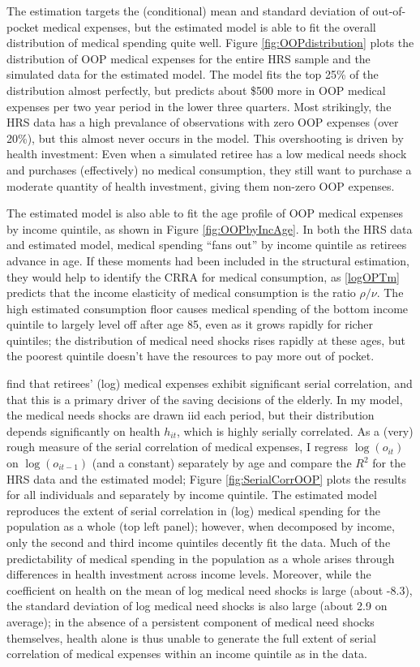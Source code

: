 \documentclass[12pt,pdftex,letterpaper]{article}
\newcommand{\Health}{h}
\newcommand{\OOP}{o}
\newcommand{\CRRAcon}{\rho}
\newcommand{\CRRAcare}{\nu}
\begin{document}
The estimation targets the (conditional) mean and standard deviation of out-of-pocket medical expenses, but the estimated model is able to fit the overall distribution of medical spending quite well.  Figure \ref{fig:OOPdistribution} plots the distribution of OOP medical expenses for the entire HRS sample and the simulated data for the estimated model.  The model fits the top 25\% of the distribution almost perfectly, but predicts about \$500 more in OOP medical expenses per two year period in the lower three quarters.  Most strikingly, the HRS data has a high prevalance of observations with zero OOP expenses (over 20\%), but this almost never occurs in the model.  This overshooting is driven by health investment: Even when a simulated retiree has a low medical needs shock and purchases (effectively) no medical consumption, they still want to purchase a moderate quantity of health investment, giving them non-zero OOP expenses.

The estimated model is also able to fit the age profile of OOP medical expenses by income quintile, as shown in Figure \ref{fig:OOPbyIncAge}.  In both the HRS data and estimated model, medical spending ``fans out'' by income quintile as retirees advance in age.  If these moments had been included in the structural estimation, they would help to identify the CRRA for medical consumption, as \eqref{logOPTm} predicts that the income elasticity of medical consumption is the ratio $\CRRAcon/\CRRAcare$.  The high estimated consumption floor causes medical spending of the bottom income quintile to largely level off after age 85, even as it grows rapidly for richer quintiles; the distribution of medical need shocks rises rapidly at these ages, but the poorest quintile doesn't have the resources to pay more out of pocket.

\cite{dinardi10} find that retirees' (log) medical expenses exhibit significant serial correlation, and that this is a primary driver of the saving decisions of the elderly.  In my model, the medical needs shocks are drawn iid each period, but their distribution depends significantly on health $\Health_{it}$, which is highly serially correlated.  As a (very) rough measure of the serial correlation of medical expenses, I regress $\log(\OOP_{it})$ on $\log(\OOP_{it-1})$ (and a constant) separately by age and compare the $R^2$ for the HRS data and the estimated model; Figure \ref{fig:SerialCorrOOP} plots the results for all individuals and separately by income quintile.  The estimated model reproduces the extent of serial correlation in (log) medical spending for the population as a whole (top left panel); however, when decomposed by income, only the second and third income quintiles decently fit the data.  Much of the predictability of medical spending in the population as a whole arises through differences in health investment across income levels.  Moreover, while the coefficient on health on the mean of log medical need shocks is large (about -8.3), the standard deviation of log medical need shocks is also large (about 2.9 on average); in the absence of a persistent component of medical need shocks themselves, health alone is thus unable to generate the full extent of serial correlation of medical expenses within an income quintile as in the data.
\end{document}
